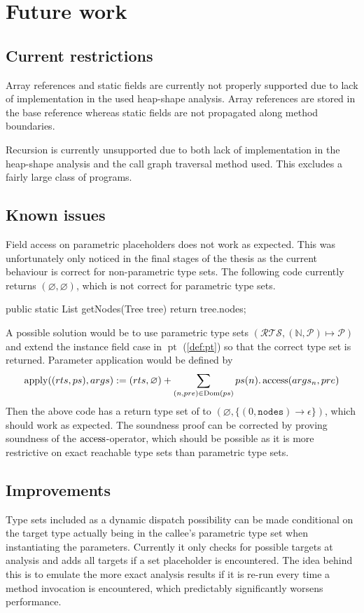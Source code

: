\chapter{Future work}
\label{chap:future}
\section{Current restrictions}
Array references and static fields are currently not properly supported due to lack of implementation in the used heap-shape analysis. Array references are stored in the base reference whereas static fields are not propagated along method boundaries.

Recursion is currently unsupported due to both lack of implementation in the heap-shape analysis and the call graph traversal method used. This excludes a fairly large class of programs.

\section{Known issues}
Field access on parametric placeholders does not work as expected. This was unfortunately only noticed in the final stages of the thesis as the current behaviour is correct for non-parametric type sets.
The following code currently returns $(\varnothing, \varnothing)$, which is not correct for parametric type sets.
\begin{javacode}
public static List getNodes(Tree tree) {
    return tree.nodes;
}
\end{javacode}
A possible solution would be to use parametric type sets $(\mathcal{RTS}, (\mathbb{N}, \mathcal{P}) \mapsto \mathcal{P})$ and extend the instance field case in $\operatorname{pt}$ (\cref{def:pt}) so that the correct type set is returned. Parameter application would be defined by  \[
    \operatorname{apply}((rts, ps), args) :=  (rts, \varnothing) + \sum_{(n,pre) \in \operatorname{Dom}(ps)} ps(n).\operatorname{access}(args_n, pre)
\]
Then the above code has a return type set of to $(\varnothing, \{ (0, \texttt{nodes}) \to \epsilon \})$, which should work as expected.
The soundness proof can be corrected by proving soundness of the $\operatorname{access}$-operator, which should be possible as it is more restrictive on exact reachable type sets than parametric type sets.


\section{Improvements}
Type sets included as a dynamic dispatch possibility can be made conditional on the target type actually being in the callee's parametric type set when instantiating the parameters. Currently it only checks for possible targets at analysis and adds all targets if a set placeholder is encountered. The idea behind this is to emulate the more exact analysis results if it is re-run every time a method invocation is encountered, which predictably significantly worsens performance.

